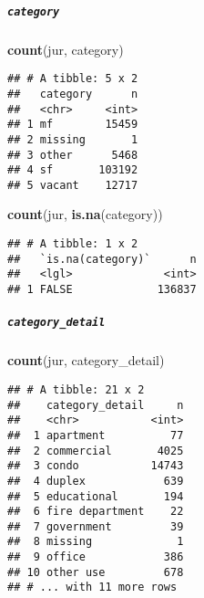\documentclass[]{article}
\newenvironment{Shaded}{\begin{snugshade}}{\end{snugshade}}
\newcommand{\KeywordTok}[1]{\textcolor[rgb]{0.13,0.29,0.53}{\textbf{#1}}}
\newcommand{\StringTok}[1]{\textcolor[rgb]{0.31,0.60,0.02}{#1}}
\newcommand{\OtherTok}[1]{\textcolor[rgb]{0.56,0.35,0.01}{#1}}
\newcommand{\ControlFlowTok}[1]{\textcolor[rgb]{0.13,0.29,0.53}{\textbf{#1}}}
\newcommand{\OperatorTok}[1]{\textcolor[rgb]{0.81,0.36,0.00}{\textbf{#1}}}
\newcommand{\NormalTok}[1]{#1}
\let\oldsubparagraph\subparagraph
\renewcommand{\subparagraph}[1]{\oldsubparagraph{#1}\mbox{}}
\begin{document}
\subparagraph{\texorpdfstring{\texttt{category}}{category}}\label{category-1}

\begin{Shaded}
\begin{Highlighting}[]
\KeywordTok{count}\NormalTok{(jur, category)}
\end{Highlighting}
\end{Shaded}

\begin{verbatim}
## # A tibble: 5 x 2
##   category      n
##   <chr>     <int>
## 1 mf        15459
## 2 missing       1
## 3 other      5468
## 4 sf       103192
## 5 vacant    12717
\end{verbatim}

\begin{Shaded}
\begin{Highlighting}[]
\KeywordTok{count}\NormalTok{(jur, }\KeywordTok{is.na}\NormalTok{(category))}
\end{Highlighting}
\end{Shaded}

\begin{verbatim}
## # A tibble: 1 x 2
##   `is.na(category)`      n
##   <lgl>              <int>
## 1 FALSE             136837
\end{verbatim}

\begin{Shaded}
\end{Shaded}

\subparagraph{\texorpdfstring{\texttt{category\_detail}}{category\_detail}}\label{category_detail-1}

\begin{Shaded}
\begin{Highlighting}[]
\KeywordTok{count}\NormalTok{(jur, category_detail)}
\end{Highlighting}
\end{Shaded}

\begin{verbatim}
## # A tibble: 21 x 2
##    category_detail     n
##    <chr>           <int>
##  1 apartment          77
##  2 commercial       4025
##  3 condo           14743
##  4 duplex            639
##  5 educational       194
##  6 fire department    22
##  7 government         39
##  8 missing             1
##  9 office            386
## 10 other use         678
## # ... with 11 more rows
\end{verbatim}
\end{document}
